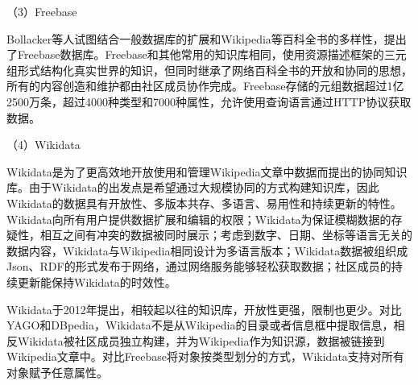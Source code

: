 \begin{comment}
开放信息提取系统会对每个输出的三元组数据给定一个置信度，如果给定一个置信度的下限，高置信度的数据被保留，低置信度的数据被过滤，此时可以通过精确度和召回率测试系统的性能。精确度是指保留的数据中正确的数据所占比例，能反映整体精确度的平均水平。召回率是指保留的数据中正确的数据占所有正确数据的比例，能反映正确的数据在不同置信度的分布情况。

实验分析显示，因为使用了更友好的训练数据，WOE-pos在精确度上更优于TEXTRUNNER，而WOE-parse在解析树的帮助下实现了最好的性能，特别是在召回率上。

Fader等人在分析TEXTRUNNER和WOE的结果之后发现，不连贯提取和无信息提取两种错误频繁出现。不连贯提取是指被提取的关系语句由多词组成，但语义不连贯而无意义。无信息提取是指提取内容忽略了句子的关键信息，例如，“父亲对母亲做出承诺”，系统返回无信息的（父亲，做出，承诺）而不是（父亲，做出承诺对，母亲）。以上的两种错误都是由系统不能提取出具有完整句法结构的关系语句造成的，Fader等人在Open IE系统中引入了一定的句法限制，提出了REVERB开放信息提取系统\citing{fader2011identifying}。30\%的REVERB提取数据的概率标签在0.8或更高，相较起TEXTRUNNER的0.13\%，在精确度上实现了越阶式的增长，不连贯提取和无信息提取的错误率也大幅减少。
\end{comment}

（3）Freebase

Bollacker等人试图结合一般数据库的扩展和Wikipedia等百科全书的多样性，提出了Freebase数据库。Freebase和其他常用的知识库相同，使用资源描述框架的三元组形式结构化真实世界的知识，但同时继承了网络百科全书的开放和协同的思想，所有的内容创造和维护都由社区成员协作完成。Freebase存储的元组数据超过1亿2500万条，超过4000种类型和7000种属性，允许使用查询语言通过HTTP协议获取数据。

（4）Wikidata

Wikidata是为了更高效地开放使用和管理Wikipedia文章中数据而提出的协同知识库。由于Wikidata的出发点是希望通过大规模协同的方式构建知识库，因此Wikidata的数据具有开放性、多版本共存、多语言、易用性和持续更新的特性。Wikidata向所有用户提供数据扩展和编辑的权限；Wikidata为保证模糊数据的存疑性，相互之间有冲突的数据被同时展示；考虑到数字、日期、坐标等语言无关的数据内容，Wikidata与Wikipedia相同设计为多语言版本；Wikidata数据被组织成Json、RDF的形式发布于网络，通过网络服务能够轻松获取数据；社区成员的持续更新能保持Wikidata的时效性。

Wikidata于2012年提出，相较起以往的知识库，开放性更强，限制也更少。对比YAGO和DBpedia，Wikidata不是从Wikipedia的目录或者信息框中提取信息，相反Wikidata被社区成员独立构建，并为Wikipedia作为知识源，数据被链接到Wikipedia文章中。对比Freebase将对象按类型划分的方式，Wikidata支持对所有对象赋予任意属性。

